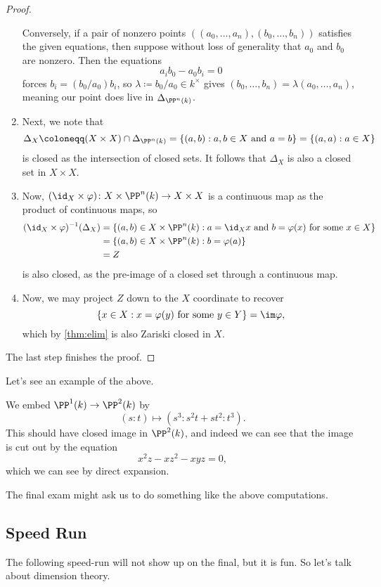 \begin{proof}
\begin{enumerate}
		Conversely, if a pair of nonzero points $((a_0,\ldots,a_n),(b_0,\ldots,b_n))$ satisfies the given equations, then suppose without loss of generality that $a_0$ and $b_0$ are nonzero. Then the equations
		\[a_ib_0-a_0b_i=0\]
		forces $b_i=(b_0/a_0)b_i$, so $\lambda\coloneqq b_0/a_0\in k^\times$ gives $(b_0,\ldots,b_n)=\lambda(a_0,\ldots,a_n)$, meaning our point does live in $\Delta_{\PP^n(k)}$.
		\item Next, we note that
		\[\Delta_X\coloneqq(X\times X)\cap\Delta_{\PP^n(k)}=\{(a,b):a,b\in X\text{ and }a=b\}=\{(a,a):a\in X\}\]
		is closed as the intersection of closed sets. It follows that $\Delta_X$ is also a closed set in $X\times X$.
		\item Now, $(\id_X\times\varphi)\colon X\times\PP^n(k)\to X\times X$ is a continuous map as the product of continuous maps, so
		\begin{align*}
			(\id_X\times\varphi)^{-1}(\Delta_X) &= \{(a,b)\in X\times\PP^n(k):a=\id_Xx\text{ and }b=\varphi(x)\text{ for some }x\in X\} \\
			&= \{(a,b)\in X\times\PP^n(k):b=\varphi(a)\} \\
			&= Z
		\end{align*}
		is also closed, as the pre-image of a closed set through a continuous map.
		\item Now, we may project $Z$ down to the $X$ coordinate to recover
		\[\{x\in X:x=\varphi(y)\text{ for some }y\in Y\}=\im\varphi,\]
		which by \autoref{thm:elim} is also Zariski closed in $X$.
	\end{enumerate}
	The last step finishes the proof.
\end{proof}
Let's see an example of the above.
\begin{ex}
	We embed $\PP^1(k)\to\PP^2(k)$ by
	\[(s:t)\mapsto\left(s^3:s^2t+st^2:t^3\right).\]
	This should have closed image in $\PP^2(k)$, and indeed we can see that the image is cut out by the equation
	\[x^2z-xz^2-xyz=0,\]
	which we can see by direct expansion.
\end{ex}
\begin{remark}
	The final exam might ask us to do something like the above computations.
\end{remark}

\subsection{Speed Run}
The following speed-run will not show up on the final, but it is fun. So let's talk about dimension theory.

